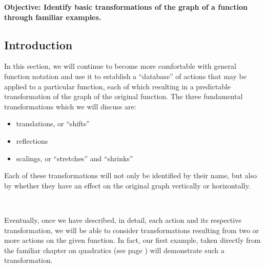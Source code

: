 \documentclass[11pt]{book}
\newcommand{\tmstrong}[1]{\textbf{#1}}
\theoremstyle{definition}  %
\newcommand{\pp}{\par~\par}
\begin{document}
{\tmstrong{Objective: Identify basic transformations of the graph of a function through familiar examples.}}

\subsection{Introduction}

In this section, we will continue to become more comfortable with general function notation and use it to establish a ``database'' of actions that may be applied to a particular function, each of which resulting in a predictable transformation of the graph of the original function.  The three fundamental transformations which we will discuss are:
\begin{itemize}
	\item translations, or ``shifts''
	\item reflections
	\item scalings, or ``stretches'' and ``shrinks''
\end{itemize}
Each of these transformations will not only be identified by their name, but also by whether they have an effect on the original graph vertically or horizontally.\pp
Eventually, once we have described, in detail, each action and its respective transformation, we will be able to consider transformations resulting from two or more actions on the given function.  In fact, our first example, taken directly from the familiar chapter on quadratics (see page \pageref{trans1}) will demonstrate such a transformation.
\end{document}
